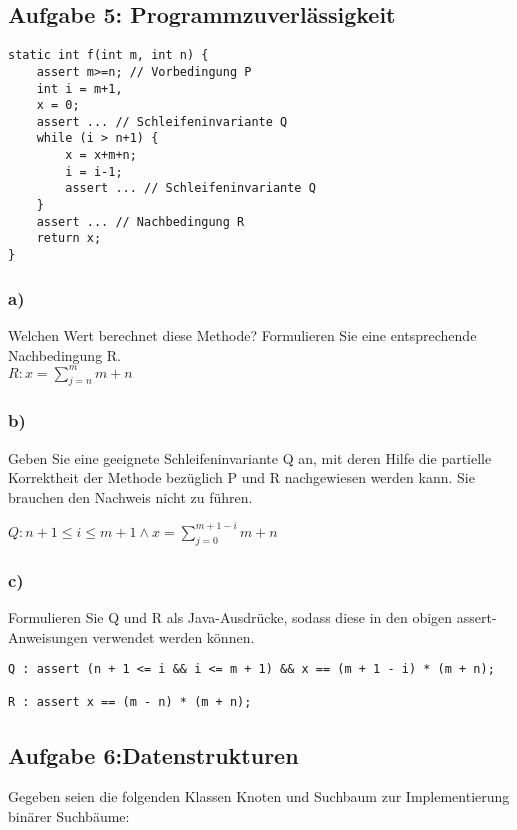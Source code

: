 \documentclass[a4paper, 10pt]{article}
\begin{document}
\subsection*{Aufgabe 5: Programmzuverlässigkeit}

\begin{lstlisting}
static int f(int m, int n) {
	assert m>=n; // Vorbedingung P
	int i = m+1,
	x = 0;
	assert ... // Schleifeninvariante Q
	while (i > n+1) {
		x = x+m+n;
		i = i-1;
		assert ... // Schleifeninvariante Q
	}
	assert ... // Nachbedingung R
	return x;
}
\end{lstlisting}

\subsubsection*{a)} 
Welchen Wert berechnet diese Methode? Formulieren Sie eine entsprechende Nachbedingung R.\\

$R: x = \sum^{m}_{j = n}m + n$

\subsubsection*{b)} 
Geben Sie eine geeignete Schleifeninvariante Q an, mit deren Hilfe die partielle Korrektheit der Methode bezüglich P und R nachgewiesen werden kann. Sie brauchen den Nachweis nicht zu führen.

$Q: n + 1 \leq i \leq m + 1 \wedge x = \sum^{m + 1 - i}_{j = 0}m + n$
\subsubsection*{c)} 
Formulieren Sie Q und R als Java-Ausdrücke, sodass diese in den obigen assert-Anweisungen verwendet werden können.
\begin{lstlisting}
Q : assert (n + 1 <= i && i <= m + 1) && x == (m + 1 - i) * (m + n);

R : assert x == (m - n) * (m + n);
\end{lstlisting}
\subsection*{Aufgabe 6:Datenstrukturen}
Gegeben seien die folgenden Klassen Knoten und Suchbaum
zur Implementierung binärer Suchbäume:
\end{document}
